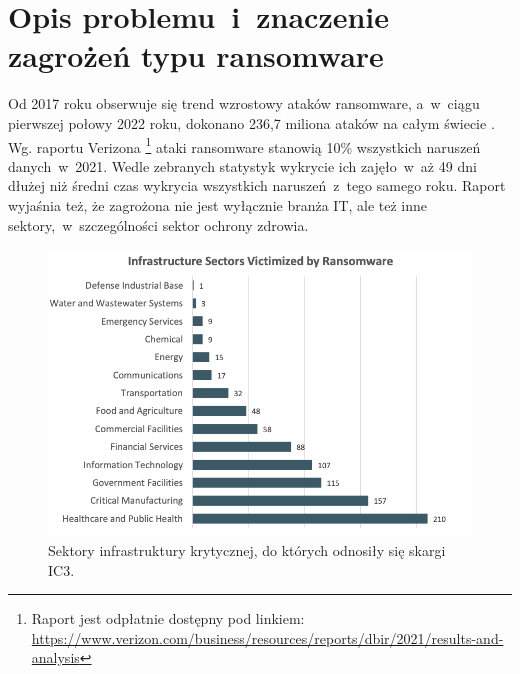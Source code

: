 \section{Opis problemu~i~znaczenie zagrożeń typu ransomware}
 Od 2017 roku obserwuje się trend wzrostowy ataków ransomware\cite{petrosyan_worldwide_nodate}, a~w~ciągu pierwszej połowy 2022 roku, dokonano 236,7 miliona ataków na całym świecie 
 \cite{petrosyan_number_nodate}. Wg. raportu Verizona \footnote{Raport jest odpłatnie dostępny pod linkiem: \url{https://www.verizon.com/business/resources/reports/dbir/2021/results-and-analysis}} ataki ransomware stanowią 10\% wszystkich naruszeń danych~w~2021. Wedle zebranych statystyk wykrycie ich zajęło~w~aż 49 dni dłużej niż średni czas wykrycia wszystkich naruszeń~z~tego samego roku. Raport wyjaśnia też, że zagrożona nie jest wyłącznie branża IT, ale też inne sektory,~w~szczególności sektor ochrony zdrowia.
\begin{figure}[H]
     \centering
     \includegraphics[width=0.78\linewidth]{rysunki/attacks_on_sectors.png}
     \caption{Sektory infrastruktury krytycznej, do których odnosiły się skargi IC3\protect\footnotemark.}
     \label{fig:enter-label}
 \end{figure}

